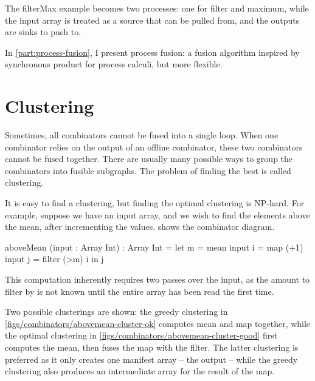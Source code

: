 The filterMax example becomes two processes: one for filter and maximum, while the input array is treated as a source that can be pulled from, and the outputs are sinks to push to.

In \cref{part:process-fusion}, I present process fusion: a fusion algorithm inspired by synchronous product for process calculi, but more flexible.

\section{Clustering}
Sometimes, all combinators cannot be fused into a single loop.
When one combinator relies on the output of an offline combinator, these two combinators cannot be fused together.
There are usually many possible ways to group the combinators into fusible subgraphs.
The problem of finding the best is called clustering.

It is easy to find a clustering, but finding the optimal clustering is NP-hard.
For example, suppose we have an input array, and we wish to find the elements above the mean, after incrementing the values.
 shows the combinator diagram.

\begin{code}
aboveMean (input : Array Int) : Array Int
 = let m = mean         input
       i = map (+1)     input
       j = filter (>m)  i
   in  j
\end{code}


This computation inherently requires two passes over the input, as the amount to filter by is not known until the entire array has been read the first time.


Two possible clusterings are shown:
the greedy clustering in \cref{figs/combinators/abovemean-cluster-ok} computes mean and map together, while the optimal clustering in \cref{figs/combinators/abovemean-cluster-good} first computes the mean, then fuses the map with the filter.
The latter clustering is preferred as it only creates one manifest array -- the output -- while the greedy clustering also produces an intermediate array for the result of the map.

